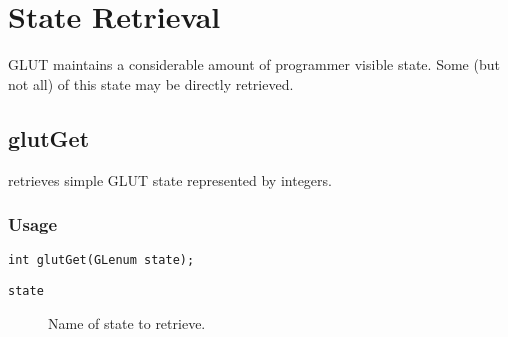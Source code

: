 \section{State Retrieval}

GLUT maintains a considerable amount of programmer visible state.
Some (but not all) of this state may be directly retrieved.

\subsection{glutGet}

 retrieves simple GLUT state represented by integers.

\subsubsection*{Usage}
\begin{verbatim}
int glutGet(GLenum state);
\end{verbatim}
\begin{description}
\item[{\tt state}]  Name of state to retrieve.
\itemsep 0in
\end{description}

